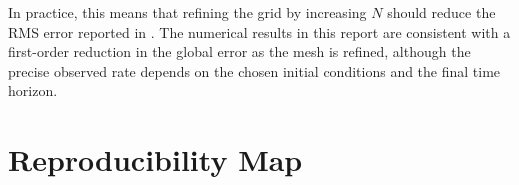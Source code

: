 \documentclass[11pt]{article}
\numberwithin{equation}{section}
\numberwithin{figure}{section}
\numberwithin{table}{section}
\begin{document}
In practice, this means that refining the grid by increasing $N$ should reduce
the RMS error reported in . The numerical results in this
report are consistent with a first-order reduction in the global error as the
mesh is refined, although the precise observed rate depends on the chosen
initial conditions and the final time horizon.

\section{Reproducibility Map}
\label{sec:reproducibility}

\end{document}
